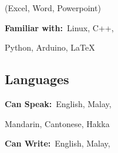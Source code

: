 \documentclass[11pt,A4,english]{article}
\begin{document}
\begin{paracol}{2}
\begin{leftcolumn}
\begin{addmargin}[2em]{1em}
\begin{addmargin}[-3em]{0em}
                    \vspace{-12pt}
                    
                    \hspace{15pt}(Excel, Word, Powerpoint)

                    \vspace{5pt}

                    \hspace{-2pt} \faCheckCircleO \hspace{1.5pt} {\bfseries Familiar with:}\ Linux, C++, \\
                    
                    \vspace{-12pt}
                    
                    \hspace{15pt}Python, Arduino, \LaTeX

                    \vspace{3pt}
                    
                \end{addmargin}
            \vspace{.25em}
        
            \subsection{Languages}
                \vspace{.25em}
                \begin{addmargin}[-3em]{.5em}
                    \vspace{0pt}

                    \hspace{16pt} \faCheckCircle \hspace{1.5pt} {\bfseries Can Speak:}\ English, Malay,\\
                    
                    \vspace{-12pt}
                    
                    \hspace{15pt}Mandarin, Cantonese, Hakka\\
                    
                    \vspace{-10pt}
                    
                    \hspace{-2pt} \faCheckCircleO \hspace{1.5pt} {\bfseries Can Write:}\ English, Malay,\\
                    

\end{addmargin}
\end{addmargin}
\end{leftcolumn}
\end{paracol}
\end{document}
